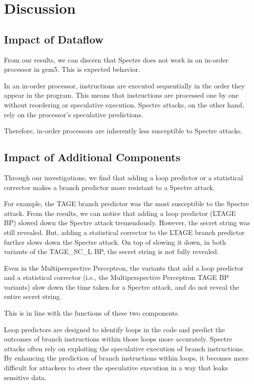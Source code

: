 \documentclass[twocolumn,showpacs,%
  nofootinbib,aps,superscriptaddress,%
  eqsecnum,prd,notitlepage,showkeys,10pt]{revtex4-1}
\begin{document}

\section{Discussion}

\subsection{Impact of Dataflow}
From our results, we can discern that Spectre does not work in an in-order processor in gem5. This is expected behavior.

In an in-order processor, instructions are executed sequentially in the order they appear in the program. This means that instructions are processed one by one without reordering or speculative execution. Spectre attacks, on the other hand, rely on the processor's speculative predictions. 

Therefore, in-order processors are inherently less susceptible to Spectre attacks.

\subsection{Impact of Additional Components}
Through our investigations, we find that adding a loop predictor or a statistical corrector makes a branch predictor more resistant to a Spectre attack.

For example, the TAGE branch predictor was the most susceptible to the Spectre attack. From the results, we can notice that adding a loop predictor (LTAGE BP) slowed down the Spectre attack tremendously. However, the secret string was still revealed. But, adding a statistical corrector to the LTAGE branch predictor further slows down the Spectre attack. On top of slowing it down, in both variants of the TAGE\_SC\_L BP, the secret string is not fully revealed.

Even in the Multiperspective Perceptron, the variants that add a loop predictor and a statistical corrector (i.e., the Multiperspective Perceptron TAGE BP variants) slow down the time taken for a Spectre attack, and do not reveal the entire secret string.

This is in line with the functions of these two components.

Loop predictors are designed to identify loops in the code and predict the outcomes of branch instructions within those loops more accurately. Spectre attacks often rely on exploiting the speculative execution of branch instructions. By enhancing the prediction of branch instructions within loops, it becomes more difficult for attackers to steer the speculative execution in a way that leaks sensitive data.
\end{document}
